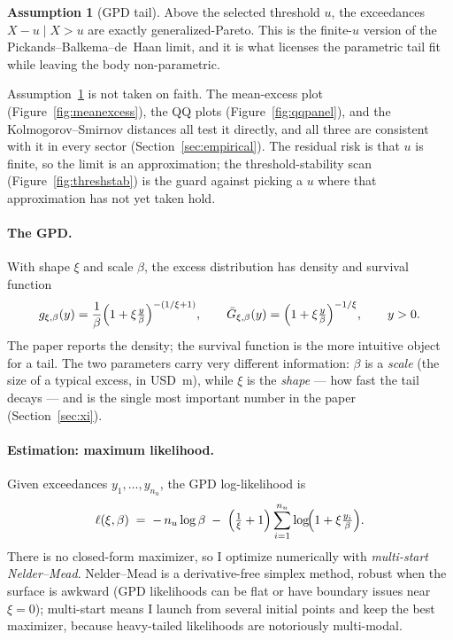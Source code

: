 \documentclass[11pt]{article}
\theoremstyle{definition}
\theoremstyle{remark}
\theoremstyle{definition}
\newtheorem{assumption}{Assumption}
\newcommand{\1}{\mathbf{1}}
\begin{document}
\begin{assumption}[GPD tail]\label{as:tail}
Above the selected threshold $u$, the exceedances $X-u\mid X>u$ are exactly
generalized-Pareto. This is the finite-$u$ version of the
Pickands--Balkema--de~Haan limit, and it is what licenses the parametric tail
fit while leaving the body non-parametric.
\end{assumption}

\noindent Assumption~\ref{as:tail} is not taken on faith. The mean-excess plot
(Figure~\ref{fig:meanexcess}), the QQ plots (Figure~\ref{fig:qqpanel}), and the
Kolmogorov--Smirnov distances all test it directly, and all three are consistent
with it in every sector (Section~\ref{sec:empirical}). The residual risk is that
$u$ is finite, so the limit is an approximation; the threshold-stability scan
(Figure~\ref{fig:threshstab}) is the guard against picking a $u$ where that
approximation has not yet taken hold.

\paragraph{The GPD.}
With shape $\xi$ and scale $\beta$, the excess distribution has density and
survival function
\[
g_{\xi,\beta}(y) = \frac{1}{\beta}\Bigl(1+\xi\tfrac{y}{\beta}\Bigr)^{-(1/\xi+1)},
\qquad
\bar G_{\xi,\beta}(y) = \Bigl(1+\xi\tfrac{y}{\beta}\Bigr)^{-1/\xi},
\qquad y>0.
\]
The paper reports the density; the survival function is the more intuitive
object for a tail. The two parameters carry very different information: $\beta$
is a \emph{scale} (the size of a typical excess, in USD~m), while $\xi$ is the
\emph{shape} --- how fast the tail decays --- and is the single most important
number in the paper (Section~\ref{sec:xi}).

\paragraph{Estimation: maximum likelihood.}
Given exceedances $y_1,\dots,y_{n_u}$, the GPD log-likelihood is
\begin{equation}\label{eq:gpdll}
\ell(\xi,\beta) \;=\; -\,n_u\log\beta
\;-\;\Bigl(\tfrac{1}{\xi}+1\Bigr)\sum_{i=1}^{n_u}\log\!\Bigl(1+\xi\tfrac{y_i}{\beta}\Bigr).
\end{equation}
There is no closed-form maximizer, so I optimize numerically with
\emph{multi-start Nelder--Mead}. Nelder--Mead is a derivative-free simplex
method, robust when the surface is awkward (GPD likelihoods can be flat or have
boundary issues near $\xi=0$); multi-start means I launch from several initial
points and keep the best maximizer, because heavy-tailed likelihoods are
notoriously multi-modal.
\end{document}
